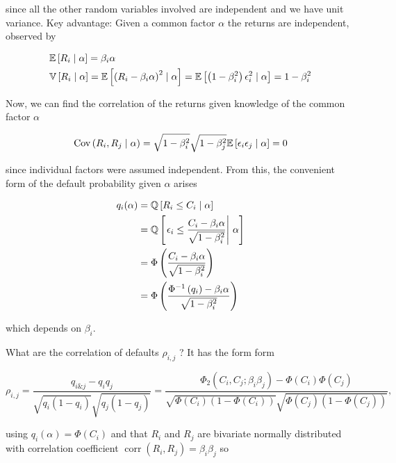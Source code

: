 since all the other random variables involved are independent and we have unit variance. Key advantage: Given a common factor $\alpha$ the returns are independent, observed by

$$
\begin{aligned}
& \E\left[R_{i} \mid \alpha\right]=\beta_{i} \alpha \\
& \mathbb{V}\left[R_{i} \mid \alpha\right]=\E\left[\left(R_{i}-\beta_{i} \alpha\right)^{2} \mid \alpha\right]=\E\left[\left(1-\beta_{i}^{2}\right) \epsilon_{i}^{2} \mid \alpha\right]=1-\beta_{i}^{2}
\end{aligned}
$$

Now, we can find the correlation of the returns given knowledge of the common factor $\alpha$

$$
\operatorname{Cov}\left(R_{i}, R_{j} \mid \alpha\right)=\sqrt{1-\beta_{i}^{2}} \sqrt{1-\beta_{j}^{2}} \E\left[\epsilon_{i} \epsilon_{j} \mid \alpha\right]=0
$$

since individual factors were assumed independent. From this, the convenient form of the default probability given $\alpha$ arises

$$
\begin{aligned}
q_{i}(\alpha) & =\Q\left[R_{i} \leq C_{i} \mid \alpha\right] \\
& =\Q\left[\left.\epsilon_{i} \leq \frac{C_{i}-\beta_{i} \alpha}{\sqrt{1-\beta_{i}^{2}}} \right\rvert\, \alpha\right] \\
& =\Phi\left(\frac{C_{i}-\beta_{i} \alpha}{\sqrt{1-\beta_{i}^{2}}}\right) \\
& =\Phi\left(\frac{\Phi^{-1}\left(q_{i}\right)-\beta_{i} \alpha}{\sqrt{1-\beta_{i}^{2}}}\right)
\end{aligned}
$$

which depends on $\beta_{i}$.

What are the correlation of defaults $\rho_{i, j}$ ? It has the form form

$$
\rho_{i, j}=\frac{q_{i \& j}-q_{i} q_{j}}{\sqrt{q_{i}\left(1-q_{i}\right)} \sqrt{q_{j}\left(1-q_{j}\right)}}=\frac{\Phi_{2}\left(C_{i}, C_{j} ; \beta_{i} \beta_{j}\right)-\Phi\left(C_{i}\right) \Phi\left(C_{j}\right)}{\sqrt{\Phi\left(C_{i}\right)\left(1-\Phi\left(C_{i}\right)\right)} \sqrt{\Phi\left(C_{j}\right)\left(1-\Phi\left(C_{j}\right)\right)}},
$$

using $q_{i}(\alpha)=\Phi\left(C_{i}\right)$ and that $R_{i}$ and $R_{j}$ are bivariate normally distributed with correlation coefficient $\operatorname{corr}\left(R_{i}, R_{j}\right)=\beta_{i} \beta_{j}$ so

